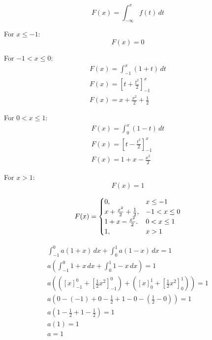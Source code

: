 \documentclass[11pt]{article}
\begin{document}
    \begin{1.6_a}
\[F(x) = \int_{-\infty}^{x} f(t) \, dt\]

For $x \leq -1$:
\[F(x) = 0\]

For $-1 < x \leq 0$:
\begin{gather*}
    F(x) = \int_{-1}^{x} (1+t) \, dt \\
    F(x) = \left[t + \frac{t^2}{2}\right]_{-1}^{x} \\
    F(x) = x + \frac{x^2}{2} + \frac{1}{2}
\end{gather*}

For $0 < x \leq 1$:
\begin{gather*}
    F(x) = \int_{0}^{x} (1-t) \, dt \\
    F(x) = \left[t - \frac{t^2}{2}\right]_{-1}^{x} \\
    F(x) = 1 + x - \frac{x^2}{2}
\end{gather*}

For $x > 1$:
\[F(x) = 1\]

\begin{gather*}
    F(x) =
    \begin{cases}
    0, & x \leq -1 \\
    x + \frac{x^2}{2} + \frac{1}{2}, & -1 < x \leq 0 \\
    1 + x - \frac{x^2}{2}. & 0 < x \leq 1 \\
    1, & x > 1
    \end{cases}$$
\end{gather*}

    \end{1.6_a}
    \begin{1.6}
        \begin{gather*}
            \int_{-1}^{0} a(1+x) \, dx + \int_{0}^{1} a(1-x) \, dx = 1\\
            a \left( \int_{-1}^{0} 1+x \, dx + \int_{0}^{1} 1-x \, dx \right) = 1\\
            a\left( \left( [x]_{-1}^{0} + \left[ \frac{1}{2} x^{2} \right]_{-1}^{0} \right) + \left(  [x]_{0}^{1} + \left[ \frac{1}{2} x^{2} \right]_{0}^{1}  \right) \right) = 1 \\
            a(0 - (-1) + 0- \frac{1}{2} + 1 - 0 - (\frac{1}{2} - 0)) = 1 \\
            a(1 - \frac{1}{2} + 1 - \frac{1}{2}) = 1 \\
            a(1) = 1 \\
            a = 1 \\
        \end{gather*}
    \end{1.6}
\end{document}
